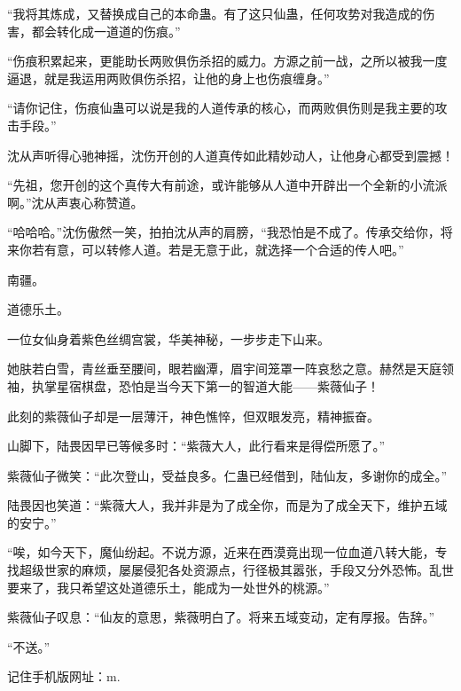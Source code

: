 \begin{this_body}
“我将其炼成，又替换成自己的本命蛊。有了这只仙蛊，任何攻势对我造成的伤害，都会转化成一道道的伤痕。”

“伤痕积累起来，更能助长两败俱伤杀招的威力。方源之前一战，之所以被我一度逼退，就是我运用两败俱伤杀招，让他的身上也伤痕缠身。”

“请你记住，伤痕仙蛊可以说是我的人道传承的核心，而两败俱伤则是我主要的攻击手段。”

沈从声听得心驰神摇，沈伤开创的人道真传如此精妙动人，让他身心都受到震撼！

“先祖，您开创的这个真传大有前途，或许能够从人道中开辟出一个全新的小流派啊。”沈从声衷心称赞道。

“哈哈哈。”沈伤傲然一笑，拍拍沈从声的肩膀，“我恐怕是不成了。传承交给你，将来你若有意，可以转修人道。若是无意于此，就选择一个合适的传人吧。”

南疆。

道德乐土。

一位女仙身着紫色丝绸宫裳，华美神秘，一步步走下山来。

她肤若白雪，青丝垂至腰间，眼若幽潭，眉宇间笼罩一阵哀愁之意。赫然是天庭领袖，执掌星宿棋盘，恐怕是当今天下第一的智道大能——紫薇仙子！

此刻的紫薇仙子却是一层薄汗，神色憔悴，但双眼发亮，精神振奋。

山脚下，陆畏因早已等候多时：“紫薇大人，此行看来是得偿所愿了。”

紫薇仙子微笑：“此次登山，受益良多。仁蛊已经借到，陆仙友，多谢你的成全。”

陆畏因也笑道：“紫薇大人，我并非是为了成全你，而是为了成全天下，维护五域的安宁。”

“唉，如今天下，魔仙纷起。不说方源，近来在西漠竟出现一位血道八转大能，专找超级世家的麻烦，屡屡侵犯各处资源点，行径极其嚣张，手段又分外恐怖。乱世要来了，我只希望这处道德乐土，能成为一处世外的桃源。”

紫薇仙子叹息：“仙友的意思，紫薇明白了。将来五域变动，定有厚报。告辞。”

“不送。”

记住手机版网址：m.

\end{this_body}

